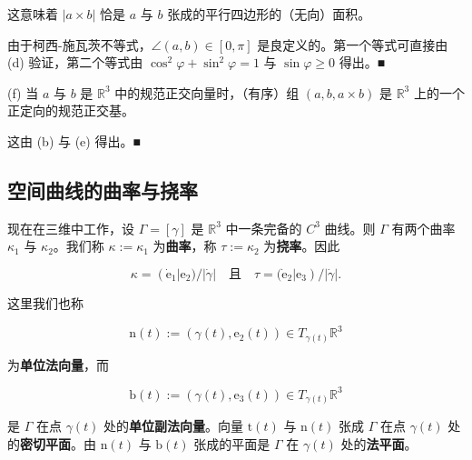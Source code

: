\begin{remark}
\begin{items}
这意味着 $ |a \times b| $ 恰是 $ a $ 与 $ b $ 张成的平行四边形的（无向）面积。

\end{items}


\proofhead
由于柯西-施瓦茨不等式，$ \angle(a, b) \in [0, \pi] $ 是良定义的。第一个等式可直接由 (d) 验证，第二个等式由 $ \cos^{2}\varphi + \sin^{2}\varphi = 1 $ 与 $ \sin\varphi \ge 0 $ 得出。\nobreak\hspace{0.35em}■

(f) 当 $ a $ 与 $ b $ 是 $ \mathbb{R}^{3} $ 中的规范正交向量时，（有序）组 $ (a, b, a \times b) $ 是 $ \mathbb{R}^{3} $ 上的一个正定向的规范正交基。

\proofhead
这由 (b) 与 (e) 得出。\nobreak\hspace{0.35em}■
\end{remark}

\subsection*{空间曲线的曲率与挠率}

现在在三维中工作，设 $ \Gamma = [\gamma] $ 是 $ \mathbb{R}^{3} $ 中一条完备的 $ C^{3} $ 曲线。则 $ \Gamma $ 有两个曲率 $ \kappa_{1} $ 与 $ \kappa_{2} $。我们称 $ \kappa := \kappa_{1} $ 为\textbf{曲率}，称 $ \tau := \kappa_{2} $ 为\textbf{挠率}。因此

\begin{equation}
\kappa = (\dot{\mathrm{e}}_{1}|\mathrm{e}_{2})/|\dot{\gamma}| \quad \text{且} \quad \tau = (\dot{\mathrm{e}}_{2}|\mathrm{e}_{3})/|\dot{\gamma}| .\tag{2.10}
\end{equation}

这里我们也称

\[
\mathrm{n}(t) := (\gamma(t), \mathrm{e}_{2}(t)) \in T_{\gamma(t)}\mathbb{R}^{3}
\]

为\textbf{单位法向量}，而

\[
\mathrm{b}(t) := (\gamma(t), \mathrm{e}_{3}(t)) \in T_{\gamma(t)}\mathbb{R}^{3}
\]

是 $ \Gamma $ 在点 $ \gamma(t) $ 处的\textbf{单位副法向量}。向量 $ \mathrm{t}(t) $ 与 $ \mathrm{n}(t) $ 张成 $ \Gamma $ 在点 $ \gamma(t) $ 处的\textbf{密切平面}。由 $ \mathrm{n}(t) $ 与 $ \mathrm{b}(t) $ 张成的平面是 $ \Gamma $ 在 $ \gamma(t) $ 处的\textbf{法平面}。

